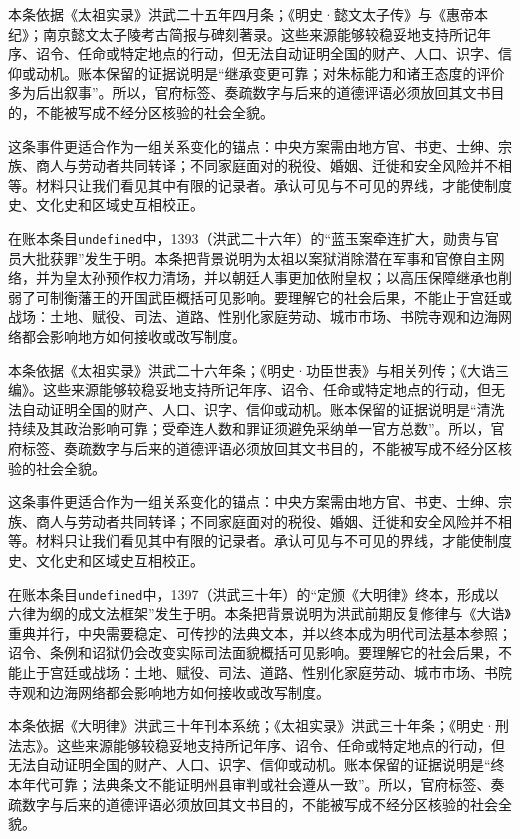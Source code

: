 本条依据《太祖实录》洪武二十五年四月条；《明史·懿文太子传》与《惠帝本纪》；南京懿文太子陵考古简报与碑刻著录。这些来源能够较稳妥地支持所记年序、诏令、任命或特定地点的行动，但无法自动证明全国的财产、人口、识字、信仰或动机。账本保留的证据说明是“继承变更可靠；对朱标能力和诸王态度的评价多为后出叙事”。所以，官府标签、奏疏数字与后来的道德评语必须放回其文书目的，不能被写成不经分区核验的社会全貌。

这条事件更适合作为一组关系变化的锚点：中央方案需由地方官、书吏、士绅、宗族、商人与劳动者共同转译；不同家庭面对的税役、婚姻、迁徙和安全风险并不相等。材料只让我们看见其中有限的记录者。承认可见与不可见的界线，才能使制度史、文化史和区域史互相校正。

在账本条目\texttt{undefined}中，1393（洪武二十六年）的“蓝玉案牵连扩大，勋贵与官员大批获罪”发生于明。本条把背景说明为太祖以案狱消除潜在军事和官僚自主网络，并为皇太孙预作权力清场，并以朝廷人事更加依附皇权；以高压保障继承也削弱了可制衡藩王的开国武臣概括可见影响。要理解它的社会后果，不能止于宫廷或战场：土地、赋役、司法、道路、性别化家庭劳动、城市市场、书院寺观和边海网络都会影响地方如何接收或改写制度。

本条依据《太祖实录》洪武二十六年条；《明史·功臣世表》与相关列传；《大诰三编》。这些来源能够较稳妥地支持所记年序、诏令、任命或特定地点的行动，但无法自动证明全国的财产、人口、识字、信仰或动机。账本保留的证据说明是“清洗持续及其政治影响可靠；受牵连人数和罪证须避免采纳单一官方总数”。所以，官府标签、奏疏数字与后来的道德评语必须放回其文书目的，不能被写成不经分区核验的社会全貌。

这条事件更适合作为一组关系变化的锚点：中央方案需由地方官、书吏、士绅、宗族、商人与劳动者共同转译；不同家庭面对的税役、婚姻、迁徙和安全风险并不相等。材料只让我们看见其中有限的记录者。承认可见与不可见的界线，才能使制度史、文化史和区域史互相校正。

在账本条目\texttt{undefined}中，1397（洪武三十年）的“定颁《大明律》终本，形成以六律为纲的成文法框架”发生于明。本条把背景说明为洪武前期反复修律与《大诰》重典并行，中央需要稳定、可传抄的法典文本，并以终本成为明代司法基本参照；诏令、条例和诏狱仍会改变实际司法面貌概括可见影响。要理解它的社会后果，不能止于宫廷或战场：土地、赋役、司法、道路、性别化家庭劳动、城市市场、书院寺观和边海网络都会影响地方如何接收或改写制度。

本条依据《大明律》洪武三十年刊本系统；《太祖实录》洪武三十年条；《明史·刑法志》。这些来源能够较稳妥地支持所记年序、诏令、任命或特定地点的行动，但无法自动证明全国的财产、人口、识字、信仰或动机。账本保留的证据说明是“终本年代可靠；法典条文不能证明州县审判或社会遵从一致”。所以，官府标签、奏疏数字与后来的道德评语必须放回其文书目的，不能被写成不经分区核验的社会全貌。


